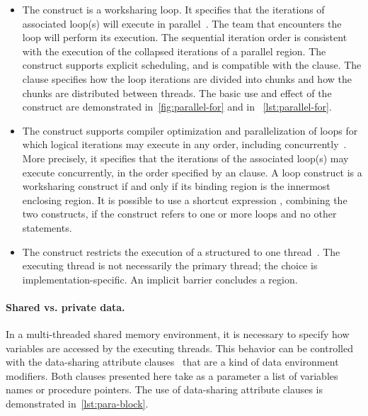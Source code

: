 \begin{itemize}

\item The  construct is a worksharing loop.
It specifies that the iterations of associated loop(s) will execute in parallel~\cite[p. 416]{openmp_api}.
The team that encounters the loop will perform its execution.
The sequential iteration order is consistent with the execution of the collapsed iterations of a parallel  region.
The  construct supports \eg explicit scheduling, and is compatible with the  clause.
The  clause specifies how the loop iterations are divided into chunks and how the chunks are distributed between threads.
The basic use and effect of the  construct are demonstrated in~\autoref{fig:parallel-for} and in ~\autoref{lst:parallel-for}.

\item The  construct
supports compiler optimization and parallelization of loops for which logical iterations may execute in any order, including concurrently~\cite[p. 423--424]{openmp_api}.
More precisely, it specifies that the iterations of the associated loop(s) may execute concurrently, in the order specified by an  clause.
A loop construct is a worksharing construct if and only if its binding region is the innermost enclosing  region.
It is possible to use a shortcut expression , combining the two constructs, if the construct refers to one or more loops and no other statements.

\item The  construct restricts the execution of a structured to one thread~\cite[p. 405]{openmp_api}.
The executing thread is not necessarily the primary thread;
the choice is implementation-specific.
An implicit barrier concludes a  region.

\end{itemize}

\paragraph*{Shared vs. private data.}
In a multi-threaded shared memory environment, it is necessary to specify how variables are accessed by the executing threads.
This behavior can be controlled with the data-sharing attribute clauses~\cite[p. 224--225]{openmp_api} that are a kind of data environment modifiers.
Both clauses presented here take as a parameter a list of variables names or procedure pointers.
The use of data-sharing attribute clauses is demonstrated in~\autoref{lst:para-block}.


